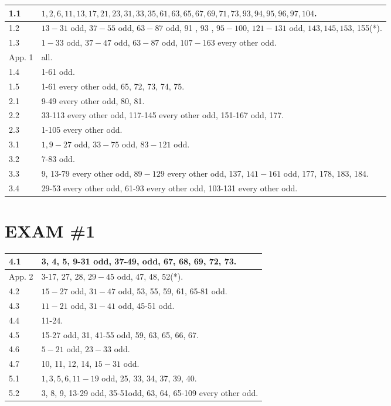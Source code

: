 \documentclass{ximera}
\begin{document}
\begin{center}
\begin{tabular}{|l|l|}
\hline
1.1 & $1,2,6,11,13,17,21,23,31,33,35,61,63,65,67,69,71,73,93,94,95,96,97,104$. \\
\hline
1.2 & $13-31$ odd, $37-55$ odd, $63-87$ odd, 91 , 93 , $95-100$, $121-131$ odd, $143,145,153$, 155(*). \\
\hline
1.3 & $1-33$ odd, $37-47$ odd, $63-87$ odd, $107-163$ every other odd. \\
\hline
App. 1 & all. \\
\hline
1.4 & 1-61 odd. \\
\hline
1.5 & 1-61 every other odd, 65, 72, 73, 74, 75. \\
\hline
2.1 & 9-49 every other odd, 80, 81. \\
\hline
2.2 & 33-113 every other odd, 117-145 every other odd, 151-167 odd, 177. \\
\hline
2.3 & 1-105 every other odd. \\
\hline
3.1 & $1,9-27$ odd, $33-75$ odd, $83-121$ odd. \\
\hline
3.2 & 7-83 odd. \\
\hline
3.3 & 9, 13-79 every other odd, $89-129$ every other odd, 137, $141-161$ odd, 177, 178, 183, 184. \\
\hline
3.4 & 29-53 every other odd, 61-93 every other odd, 103-131 every other odd. \\
\hline
\end{tabular}
\end{center}

\section*{EXAM \#1}
\begin{center}
\begin{tabular}{|l|l|}
\hline
4.1 & 3, 4, 5, 9-31 odd, 37-49, odd, 67, 68, 69, 72, 73. \\
\hline
App. 2 & 3-17, 27, 28, $29-45$ odd, 47, 48, 52(*). \\
\hline
4.2 & $15-27$ odd, $31-47$ odd, 53, 55, 59, 61, 65-81 odd. \\
\hline
4.3 & $11-21$ odd, $31-41$ odd, 45-51 odd. \\
\hline
4.4 & 11-24. \\
\hline
4.5 & 15-27 odd, 31, 41-55 odd, 59, 63, 65, 66, 67. \\
\hline
4.6 & $5-21$ odd, $23-33$ odd. \\
\hline
4.7 & 10, 11, 12, 14, $15-31$ odd. \\
\hline
5.1 & $1,3,5,6,11-19$ odd, 25, 33, 34, 37, 39, 40. \\
\hline
5.2 & 3, 8, 9, 13-29 odd, 35-51odd, 63, 64, 65-109 every other odd. \\
\hline
\end{tabular}
\end{center}
\end{document}
